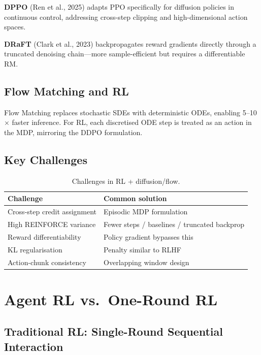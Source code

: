\textbf{DPPO} (Ren et al., 2025) adapts PPO specifically for diffusion policies in continuous control, addressing cross-step clipping and high-dimensional action spaces.

\textbf{DRaFT} (Clark et al., 2023) backpropagates reward gradients directly through a truncated denoising chain---more sample-efficient but requires a differentiable RM.

\subsection{Flow Matching and RL}

Flow Matching replaces stochastic SDEs with deterministic ODEs, enabling 5--10$\times$ faster inference.
For RL, each discretised ODE step is treated as an action in the MDP, mirroring the DDPO formulation.

\subsection{Key Challenges}

\begin{table}[htbp]
\centering
\caption{Challenges in RL + diffusion/flow.}
\begin{tabular}{@{}ll@{}}
\toprule
\textbf{Challenge} & \textbf{Common solution} \\
\midrule
Cross-step credit assignment & Episodic MDP formulation \\
High REINFORCE variance & Fewer steps / baselines / truncated backprop \\
Reward differentiability & Policy gradient bypasses this \\
KL regularisation & Penalty similar to RLHF \\
Action-chunk consistency & Overlapping window design \\
\bottomrule
\end{tabular}
\end{table}

\section{Agent RL vs.\ One-Round RL}
\label{sec:agent-rl}

\subsection{Traditional RL: Single-Round Sequential Interaction}


